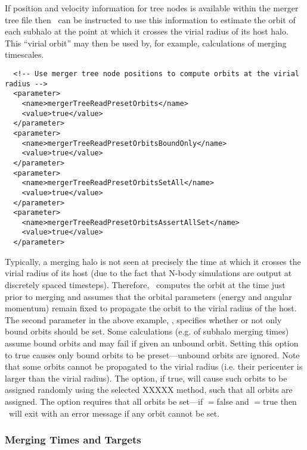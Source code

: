 If position and velocity information for tree nodes is available within the merger tree file then \glc\ can be instructed to use this information to estimate the orbit of each subhalo at the point at which it crosses the virial radius of its host halo. This ``virial orbit'' may then be used by, for example, calculations of merging timescales.
\begin{verbatim}
  <!-- Use merger tree node positions to compute orbits at the virial radius -->
  <parameter>
    <name>mergerTreeReadPresetOrbits</name>
    <value>true</value>
  </parameter>
  <parameter>
    <name>mergerTreeReadPresetOrbitsBoundOnly</name>
    <value>true</value>
  </parameter>
  <parameter>
    <name>mergerTreeReadPresetOrbitsSetAll</name>
    <value>true</value>
  </parameter>
  <parameter>
    <name>mergerTreeReadPresetOrbitsAssertAllSet</name>
    <value>true</value>
  </parameter>
\end{verbatim}
Typically, a merging halo is not seen at precisely the time at which it crosses the virial radius of its host (due to the fact that N-body simulations are output at discretely spaced timesteps). Therefore, \glc\ computes the orbit at the time just prior to merging and assumes that the orbital parameters (energy and angular momentum) remain fixed to propagate the orbit to the virial radius of the host. The second parameter in the above example, {\normalfont \ttfamily [mergerTreeReadPresetOrbitsBoundOnly]}, specifies whether or not only bound orbits should be set. Some calculations (e.g. of subhalo merging times) assume bound orbits and may fail if given an unbound orbit. Setting this option to {\normalfont \ttfamily true} causes only bound orbits to be preset---unbound orbits are ignored. Note that some orbits cannot be propagated to the virial radius (i.e. their pericenter is larger than the virial radius). The {\normalfont \ttfamily [mergerTreeReadPresetOrbitsSetAll]} option, if true, will cause such orbits to be assigned randomly using the selected XXXXX method, such that all orbits are assigned. The {\normalfont \ttfamily [mergerTreeReadPresetOrbitsAssertAllSet]} option requires that all orbits be set---if {\normalfont \ttfamily [mergerTreeReadPresetOrbitsSetAll]}$=${\normalfont \ttfamily false} and {\normalfont \ttfamily [mergerTreeReadPresetOrbitsAssertAllSet]}$=${\normalfont \ttfamily true} then \glc\ will exit with an error message if any orbit cannot be set.

\subsubsection{Merging Times and Targets}

